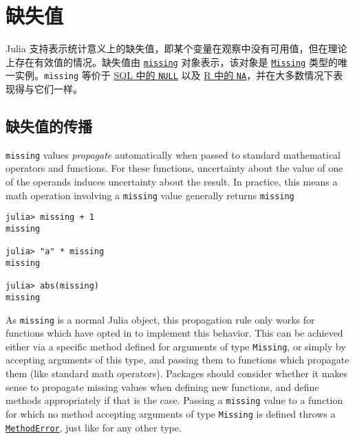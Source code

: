 \chapter{缺失值}



Julia 支持表示统计意义上的缺失值，即某个变量在观察中没有可用值，但在理论上存在有效值的情况。缺失值由 \hyperlink{14596725676261444434}{\texttt{missing}} 对象表示，该对象是 \hyperlink{9306488559141158579}{\texttt{Missing}} 类型的唯一实例。\texttt{missing} 等价于 \href{https://en.wikipedia.org/wiki/NULL\_(SQL)}{SQL 中的 \texttt{NULL}} 以及 \href{https://cran.r-project.org/doc/manuals/r-release/R-lang.html\#NA-handling}{R 中的 \texttt{NA}}，并在大多数情况下表现得与它们一样。



\hypertarget{16983381017967078050}{}


\section{缺失值的传播}



\texttt{missing} values \emph{propagate} automatically when passed to standard mathematical operators and functions. For these functions, uncertainty about the value of one of the operands induces uncertainty about the result. In practice, this means a math operation involving a \texttt{missing} value generally returns \texttt{missing}




\begin{verbatim}
julia> missing + 1
missing

julia> "a" * missing
missing

julia> abs(missing)
missing
\end{verbatim}



As \texttt{missing} is a normal Julia object, this propagation rule only works for functions which have opted in to implement this behavior. This can be achieved either via a specific method defined for arguments of type \texttt{Missing}, or simply by accepting arguments of this type, and passing them to functions which propagate them (like standard math operators). Packages should consider whether it makes sense to propagate missing values when defining new functions, and define methods appropriately if that is the case. Passing a \texttt{missing} value to a function for which no method accepting arguments of type \texttt{Missing} is defined throws a \hyperlink{68769522931907606}{\texttt{MethodError}}, just like for any other type.




